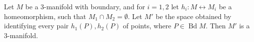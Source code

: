 Let $M$ be a 3-manifold with boundary, and for $i = 1, 2$ let $h_i: M \leftrightarrow M_i$ be a homeomorphism, such that $M_1 \cap M_2 = \emptyset$. Let $M'$ be the space obtained by identifying every pair $h_1(P), h_2(P)$ of points, where $P \in \operatorname{Bd} M$. Then $M'$ is a 3-manifold.
